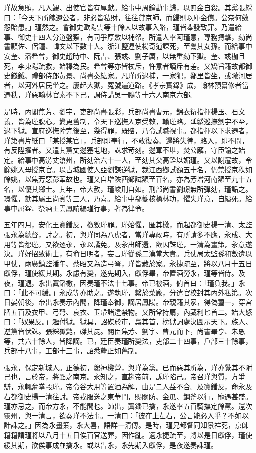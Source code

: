 \begin{pinyinscope}
瑾故急賄，凡入覲、出使官皆有厚獻。給事中周鑰勘事歸，以無金自殺。其黨張綵曰：「今天下所餽遺公者，非必皆私財，往往貸京師，而歸則以庫金償。公奈何斂怨貽患。」瑾然之。會御史歐陽雲等十餘人以故事入賂，瑾皆舉發致罪。乃遣給事、御史十四人分道盤察，有司爭厚斂以補帑。所遣人率阿瑾意，專務搏擊，劾尚書顧佐、侶鐘、韓文以下數十人。浙江鹽運使楊奇逋課死，至鬻其女孫。而給事中安奎、潘希曾，御史趙時中、阮吉、張彧、劉子厲，以無重劾下獄。奎、彧枷且死，李東陽疏救，始釋為民。希曾等亦皆杖斥，忤意者謫斥有差。又矯旨籍故都御史錢鉞、禮部侍郎黃景、尚書秦紘家。凡瑾所逮捕，一家犯，鄰里皆坐，或瞰河居者，以河外居民坐之。屢起大獄，冤號遍道路。《孝宗實錄》成，翰林預纂修者當遷秩，瑾惡翰林官素不下己，調侍講吳一鵬等十六人南京六部。

是時，內閣焦芳、劉宇，吏部尚書張彩，兵部尚書曹元，錦衣衛指揮楊玉、石文義，皆為瑾腹心。變更舊制，令天下巡撫入京受敕，輸瑾賂。延綏巡撫劉宇不至，逮下獄。宣府巡撫陸完後至，幾得罪，既賂，乃令試職視事。都指揮以下求遷者，瑾第書片紙曰「某授某官」，兵部即奉行，不敢復奏。邊將失律，賂入，即不問，有反陞擢者。又遣其黨丈邊塞屯地，誅求苛刻。邊軍不堪，焚公廨，守臣諭之始定。給事中高淓丈滄州，所劾治六十一人，至劾其父高銓以媚瑾。又以謝遷故，令餘姚入毋授京官。以占城國使人亞劉謀逆獄，裁江西鄉試額五十名，仍禁授京秩如餘姚，以焦芳惡彭華故也。瑾又自增陜西鄉試額至百名，亦為芳增河南額至九十五名，以優其鄉士。其年，帝大赦，瑾峻刑自如。刑部尚書劉璟無所彈劾，瑾詬之。璟懼，劾其屬王尚賓等三人，乃喜。給事中郗夔核榆林功，懼失瑾意，自縊死。給事中屈銓、祭酒王雲鳳請編瑾行事，著為律令。

五年四月，安化王寘鐇反，檄數瑾罪。瑾始懼，匿其檄，而起都御史楊一清、太監張永為總督，討之。初，與瑾同為八虎者，當瑾專政時，有所請多不應，永成、大用等皆怨瑾。又欲逐永，永以譎免。及永出師還，欲因誅瑾，一清為畫策，永意遂決。瑾好招致術士，有俞日明者，妄言瑾從孫二漢當大貴。兵仗局太監孫和數遺以甲仗，兩廣鎮監潘午、蔡昭又為造弓弩，瑾皆藏於家。永捷疏至，將以八月十五日獻俘，瑾使緩其期。永慮有變，遂先期入，獻俘畢，帝置酒勞永，瑾等皆侍。及夜，瑾退，永出寘鐇檄，因奏瑾不法十七事。帝已被酒，俯首曰：「瑾負我。」永曰：「此不可緩。」永成等亦助之。遂執瑾，繫於菜廠，分遣官校封其內外私第。次日晏朝後，帝出永奏示內閣，降瑾奉御，謫居鳳陽。帝親籍其家，得偽璽一，穿宮牌五百及衣甲、弓弩、哀衣、玉帶諸違禁物。又所常持扇，內藏利匕首二。始大怒曰：「奴果反。」趣付獄。獄具，詔磔於市，梟其首，榜獄詞處決圖示天下。族人、逆黨皆伏誅。張綵獄斃，磔其屍。閣臣焦芳、劉宇、曹元而下，尚書畢亨、朱恩等，共六十餘人，皆降謫。已，廷臣奏瑾所變法，吏部二十四事，戶部三十餘事，兵部十八事，工部十三事，詔悉釐正如舊制。

張永，保定新城人。正德初，總神機營，與瑾為黨。已而惡其所為，瑾亦覺其不附己也，言於帝，將黜之南京。永知之，直趨帝前，訴瑾陷己。帝召瑾與質，方爭辯，永輒奮拳毆瑾。帝令谷大用等置酒為解，由是二人益不合。及寘鐇反，命永及右都御史楊一清往討。帝戎服送之東華門，賜關防、金瓜、鋼斧以行，寵遇甚盛。瑾亦忌之，而帝方永，不能間也。師出，寘鐇已擒，永遂率五百騎撫定餘黨。還次靈州，與一清言，欲奏瑾不法事。一清曰：「彼在上左右，公言能必入乎？不如以計誅之。」因為永畫策，永大喜，語詳一清傳。是時，瑾兄都督同知景祥死，京師籍籍謂瑾將以八月十五日俟百官送葬，因作亂。適永捷疏至，將以是日獻俘，瑾使緩其期，欲俟事成並擒永。或以告永，永先期入獻俘，是夜遂奏誅瑾。


\end{pinyinscope}
